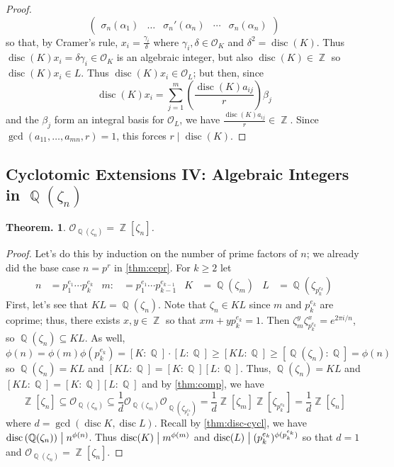 \documentclass[11pt, a4paper]{memoir}
\DeclareMathOperator{\Q}{{\mathbb{Q}}}
\DeclareMathOperator{\Z}{{\mathbb{Z}}}
\renewcommand{\div}{\bigm|}
\theoremstyle{change}
\newtheorem{theorem}{Theorem.}[section]
\theoremstyle{plain}
\theoremstyle{nonumberplain}
\newtheorem{proof}{Proof}
\DeclareMathOperator{\disc}{disc}
\numberwithin{equation}{section}
\begin{document}
\begin{proof}
\begin{equation*}
\begin{pmatrix}
            \sigma_n(\alpha_1)&\hdots&\sigma_n'(\alpha_n)&\cdots&\sigma_n(\alpha_n)
        \end{pmatrix}
    \end{equation*}
    so that, by Cramer's rule, $x_i=\frac{\gamma_i}{\delta}$ where $\gamma_i,\delta\in\mathcal{O}_K$ and $\delta^2=\disc(K)$.
    Thus $\disc(K)x_i=\delta\gamma_i\in\mathcal{O}_K$ is an algebraic integer, but also $\disc(K)\in\Z$ so $\disc(K)x_i\in L$.
    Thus $\disc(K)x_i\in \mathcal{O}_L$; but then, since
    \begin{equation*}
        \disc(K)x_i = \sum\limits_{j=1}^m\left(\frac{\disc(K)a_{ij}}{r}\right)\beta_j
    \end{equation*}
    and the $\beta_j$ form an integral basis for $\mathcal{O}_L$, we have $\frac{\disc(K)a_{ij}}{r}\in\Z$.
    Since $\gcd(a_{11},\ldots,a_{mn},r)=1$, this forces $r\mid\disc(K)$.
\end{proof}
\subsection{Cyclotomic Extensions IV: Algebraic Integers in \texorpdfstring{$\Q(\zeta_n)$}{Qzn}}
\begin{theorem}
    $\mathcal{O}_{\Q(\zeta_n)}=\Z[\zeta_n]$.
\end{theorem}
\begin{proof}
    Let's do this by induction on the number of prime factors of $n$; we already did the base case $n=p^r$ in \cref{thm:cepr}.
    For $k\geq 2$ let
    \begin{align*}
        n&=p_1^{e_1}\cdots p_k^{e_k} &
        m:&=p_1^{e_1}\cdots p_{k-1}^{e_{k-1}} &
        K&=\Q\left(\zeta_{m}\right) &
        L&=\Q\left(\zeta_{p_k^{e_k}}\right)
    \end{align*}
    First, let's see that $KL=\Q(\zeta_n)$.
    Note that $\zeta_n\in KL$ since $m$ and $p_k^{e_k}$ are coprime; thus, there exists $x,y\in\Z$ so that $xm+yp_k^{e_k}=1$.
    Then $\zeta_m^y\zeta_{p_k^{e_k}}^x=e^{2\pi i/n}$, so $\Q(\zeta_n)\subseteq KL$.
    As well,
    \begin{equation*}
        \phi(n)=\phi(m)\phi\left(p_k^{e_k}\right)=[K:\Q]\cdot[L:\Q]\geq [KL:\Q]\geq[\Q(\zeta_n):\Q]=\phi(n)
    \end{equation*}
    so $\Q(\zeta_n)=KL$ and $[KL:\Q]=[K:\Q][L:\Q]$.
    Thus, $\Q(\zeta_n)=KL$ and $[KL:\Q]=[K:\Q][L:\Q]$ and by \cref{thm:comp}, we have
    \begin{equation*}
        \Z[\zeta_n]\subseteq \mathcal{O}_{\Q(\zeta_n)}\subseteq\frac{1}{d}\mathcal{O}_{\Q(\zeta_m)}\mathcal{O}_{\Q(\zeta_{p_k^{e_k}})}=\frac{1}{d}\Z[\zeta_m]\Z[\zeta_{p_k^{e_k}}]=\frac{1}{d}\Z[\zeta_n]
    \end{equation*}
    where $d=\gcd(\disc K,\disc L)$.
    Recall by \cref{thm:disc-cycl}, we have $\disc\left(\Q(\zeta_n)\right)\div n^{\phi(n)}$.
    Thus $\disc(K)\div m^{\phi(m)}$ and $\disc(L)\div (p_k^{e_k})^{\phi(p_k^{e_k})}$ so that $d=1$ and $\mathcal{O}_{\Q(\zeta_n)}=\Z[\zeta_n]$.
\end{proof}
\end{document}
